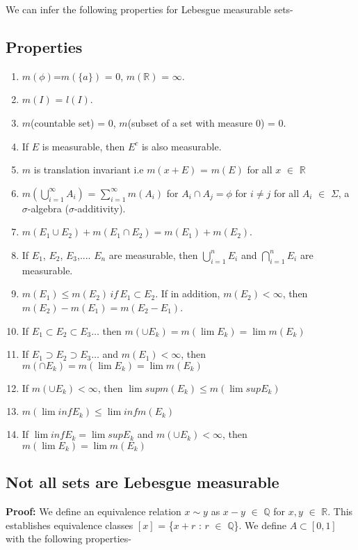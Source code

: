 \documentclass{article}
\begin{document}
We can infer the following properties for Lebesgue measurable sets-

\subsection{Properties}
\begin{enumerate}
    \item $m(\phi)$=$m(\{a\})$ = 0, $m(\mathbb{R})$ = $\infty$.
    \item $m(I)$ = $l(I)$.
    \item $m$(countable set) = 0, $m$(subset of a set with measure 0) = 0.
    \item If $E$ is measurable, then $E^c$ is also measurable.
    \item $m$ is translation invariant i.e $m(x + E)$ = $m(E)$ for all $x$ $\in$ $\mathbb{R}$
    \item $m(\bigcup \limits_{i=1}^\infty A_i)$ = $\sum \limits_{i=1}^\infty m(A_i)$ for $A_i \cap A_j = \phi$ for $i \neq j$ for all $A_i$ $\in$ $\Sigma$, a $\sigma$-algebra ($\sigma$-additivity).
    \item $m(E_1 \cup E_2) + m(E_1 \cap E_2) = m(E_1)+ m(E_2)$.
    \item If $E_1$, $E_2$, $E_3$,.... $E_n$ are measurable, then $\bigcup\limits_{i=1}^{n}E_i$ and $\bigcap\limits_{i=1}^{n}E_i$ are measurable.
    \item $m(E_1) \leq m(E_2)\, if \, E_1 \subset E_2$. If in addition, $m(E_2) <\infty$, then $m(E_2)-m(E_1)=m(E_2-E_1)$.
    \item If $E_1 \subset E_2 \subset E_3 \dots$ then $m(\cup E_k)=m(\lim E_k)=\lim m(E_k)$
    \item If $E_1 \supset E_2 \supset E_3 \dots$ and $m(E_1) < \infty $, then $m(\cap     E_k)=m(\lim E_k)=\lim m(E_k)$
    \item If $m(\cup E_k) < \infty$, then $\lim sup m(E_k) \leq m(\lim sup E_k)$
    \item  $ m(\lim inf E_k) \leq \lim inf m(E_k) $
    \item If $\lim inf E_k = \lim sup E_k$ and $m(\cup E_k)<\infty$, then $m(\lim E_k)=\lim m(E_k)$
\end{enumerate}


\subsection{Not all sets are Lebesgue measurable}


\textbf{Proof: }We define an equivalence relation $x \sim y$ as $x - y$ $\in$ $\mathbb{Q}$ for $x, y$  $\in$ $\mathbb{R}$. This establishes equivalence classes $[x]$ = \{$x + r$ : $r$ $\in$ $\mathbb{Q}$\}. We define $A \subset [0, 1]$ with the following properties-
\end{document}
